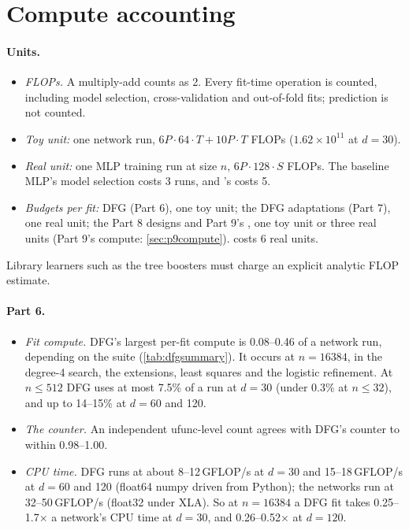 \section{Compute accounting}\label{app:compute}

\paragraph{Units.}
\begin{itemize}
\item \emph{FLOPs.} A multiply-add counts as 2. Every fit-time operation is counted, including model selection, cross-validation and out-of-fold fits; prediction is not counted.
\item \emph{Toy unit:} one network run, $6P\cdot64\cdot T+10P\cdot T$ FLOPs ($1.62\times10^{11}$ at $d=30$).
\item \emph{Real unit:} one MLP training run at size $n$, $6P\cdot128\cdot S$ FLOPs. The baseline MLP's model selection costs 3 runs, and 's costs 5.
\item \emph{Budgets per fit:} DFG (Part 6), one toy unit; the DFG adaptations (Part 7), one real unit; the Part 8 designs and Part 9's , one toy unit or three real units (Part 9's compute: \cref{sec:p9compute}).  costs 6 real units.
\end{itemize}
Library learners such as the tree boosters must charge an explicit analytic FLOP estimate.

\paragraph{Part 6.}
\begin{itemize}
\item \emph{Fit compute.} DFG's largest per-fit compute is 0.08--0.46 of a network run, depending on the suite (\cref{tab:dfgsummary}). It occurs at $n=16384$, in the degree-4 search, the extensions, least squares and the logistic refinement. At $n\le512$ DFG uses at most 7.5\% of a run at $d=30$ (under 0.3\% at $n\le32$), and up to 14--15\% at $d=60$ and 120.
\item \emph{The counter.} An independent ufunc-level count agrees with DFG's counter to within 0.98--1.00.
\item \emph{CPU time.} DFG runs at about 8--12\,GFLOP/s at $d=30$ and 15--18\,GFLOP/s at $d=60$ and 120 (float64 numpy driven from Python); the networks run at 32--50\,GFLOP/s (float32 under XLA). So at $n=16384$ a DFG fit takes 0.25--1.7$\times$ a network's CPU time at $d=30$, and 0.26--0.52$\times$ at $d=120$.
\end{itemize}

